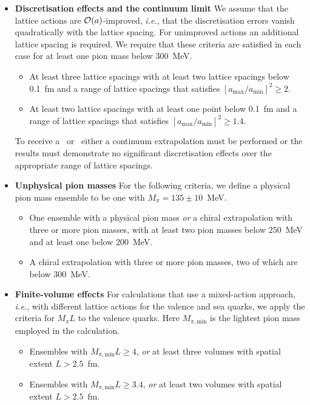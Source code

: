 \begin{itemize}
\item {\bfseries Discretisation effects and the continuum limit}
We assume that the lattice actions are ${\cal O}(a)$-improved, {\it i.e.}, 
that the discretisation errors vanish quadratically with the lattice spacing. 
%
For unimproved actions an additional lattice spacing is required. 
%
We require that these criteria are satisfied in each case for at least one 
pion mass below 300~MeV.
%
\begin{itemize}
%
\item[\bstar] At least three lattice spacings with at least two lattice 
spacings below 0.1~fm and a range of lattice spacings that satisfies 
$[a_{\mathrm{max}}/a_{\mathrm{min}}]^2 \geq 2$.
%
\item[\bcirc] At least two lattice spacings with at least one point below 
0.1~fm and a range of lattice spacings that satisfies 
$[a_{\mathrm{max}}/a_{\mathrm{min}}]^2 \geq 1.4$.
%
\end{itemize}
%
To receive a \bstar~or \bcirc~either a continuum extrapolation must be 
performed or the results must demonstrate no significant discretisation 
effects over the appropriate range of lattice spacings.

\item {\bfseries Unphysical pion masses}
For the following criteria, we define a physical pion mass ensemble 
to be one with $M_\pi=135\pm 10$~MeV.
%
\begin{itemize}
\item[\bstar] One ensemble with a physical pion mass \emph{or} a chiral 
extrapolation with three or more pion masses, with at least two pion masses 
below 250~MeV and at least one below 200~MeV.
%
\item[\bcirc] A chiral extrapolation with three or more pion masses, two of 
which are below 300~MeV.
%
\end{itemize}

\item {\bfseries Finite-volume effects}
%
For calculations that use a mixed-action approach, {\it i.e.},
with different lattice actions for the valence and sea quarks, 
we apply the criteria for $M_\pi L$ to the valence quarks. Here $M_{\pi,\mathrm{min}}$
is the lightest pion mass employed in the calculation.
%
\begin{itemize}
%
\item[\bstar] Ensembles with $M_{\pi,\mathrm{min}}L\geq 4$, \emph{or} at least 
three volumes with spatial extent $L>2.5$~fm.
\item[\bcirc] Ensembles with $M_{\pi,\mathrm{min}}L \geq 3.4$, \emph{or} at least 
two volumes with spatial extent $L>2.5$~fm.
\end{itemize}


\end{itemize}
